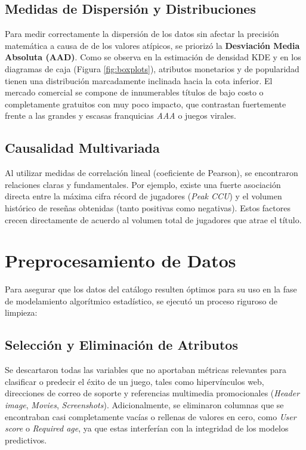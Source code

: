 \documentclass[conference]{IEEEtran}
\begin{document}
\subsection{Medidas de Dispersión y Distribuciones}
Para medir correctamente la dispersión de los datos sin afectar la precisión matemática a causa de de los valores atípicos, se priorizó la \textbf{Desviación Media Absoluta (AAD)}. Como se observa en la estimación de densidad KDE y en los diagramas de caja (Figura \ref{fig:boxplots}), atributos monetarios y de popularidad tienen una distribución marcadamente inclinada hacia la cota inferior. El mercado comercial se compone de innumerables títulos de bajo costo o completamente gratuitos con muy poco impacto, que contrastan fuertemente frente a las grandes y escasas franquicias \textit{AAA} o juegos virales.

\subsection{Causalidad Multivariada}
Al utilizar medidas de correlación lineal (coeficiente de Pearson), se encontraron relaciones claras y fundamentales. Por ejemplo, existe una fuerte asociación directa entre la máxima cifra récord de jugadores (\textit{Peak CCU}) y el volumen histórico de reseñas obtenidas (tanto positivas como negativas). Estos factores crecen directamente de acuerdo al volumen total de jugadores que atrae el título.

\section{Preprocesamiento de Datos}
Para asegurar que los datos del catálogo resulten óptimos para su uso en la fase de modelamiento algorítmico estadístico, se ejecutó un proceso riguroso de limpieza:

\subsection{Selección y Eliminación de Atributos}
Se descartaron todas las variables que no aportaban métricas relevantes para clasificar o predecir el éxito de un juego, tales como hipervínculos web, direcciones de correo de soporte y referencias multimedia promocionales (\textit{Header image}, \textit{Movies}, \textit{Screenshots}). Adicionalmente, se eliminaron columnas que se encontraban casi completamente vacías o rellenas de valores en cero, como \textit{User score} o \textit{Required age}, ya que estas interferían con la integridad de los modelos predictivos.
\end{document}
